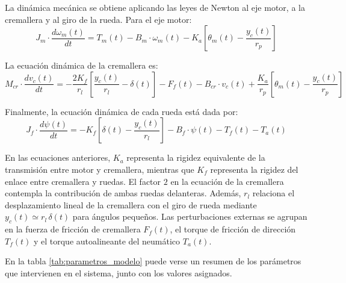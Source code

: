 \documentclass{article}
\begin{document}
La dinámica mecánica se obtiene aplicando las leyes de Newton al eje motor, a la cremallera y al giro de la rueda. Para el eje motor:
\begin{equation}
J_m \cdot \frac{d\omega_m(t)}{dt} = T_m(t) - B_m \cdot \omega_m(t) - K_{a} \left[ \theta_m(t) - \frac{y_c(t)}{r_p} \right]
\label{ec_motor}
\end{equation}

La ecuación dinámica de la cremallera es:
\begin{equation}
M_{cr} \cdot \frac{dv_c(t)}{dt} = -\frac{2 K_f}{r_l} \left[ \frac{y_c(t)}{r_l} - \delta(t) \right] - F_f(t) - B_{cr} \cdot v_c(t) + \frac{K_a}{r_p} \left[ \theta_m(t) - \frac{y_c(t)}{r_p} \right]
\label{ec_cremallera}
\end{equation}

Finalmente, la ecuación dinámica de cada rueda está dada por:
\begin{equation}
J_f \cdot \frac{d\psi(t)}{dt} = -K_f \left[ \delta(t) - \frac{y_c(t)}{r_l} \right] - B_f \cdot \psi(t) - T_f(t) - T_a(t)
\label{ec_rueda}
\end{equation}

En las ecuaciones anteriores, $K_a$ representa la rigidez equivalente de la transmisión entre motor y cremallera, mientras que $K_f$ representa la rigidez del enlace entre cremallera y ruedas. El factor $2$ en la ecuación de la cremallera contempla la contribución de ambas ruedas delanteras. Además, $r_l$ relaciona el desplazamiento lineal de la cremallera con el giro de rueda mediante $y_c(t)\simeq r_l\,\delta(t)$ para ángulos pequeños. Las perturbaciones externas se agrupan en la fuerza de fricción de cremallera $F_f(t)$, el torque de fricción de dirección $T_f(t)$ y el torque autoalineante del neumático $T_a(t)$.

En la tabla \ref{tab:parametros_modelo} puede verse un resumen de los parámetros que intervienen en el sistema, junto con los valores asignados.
\end{document}
